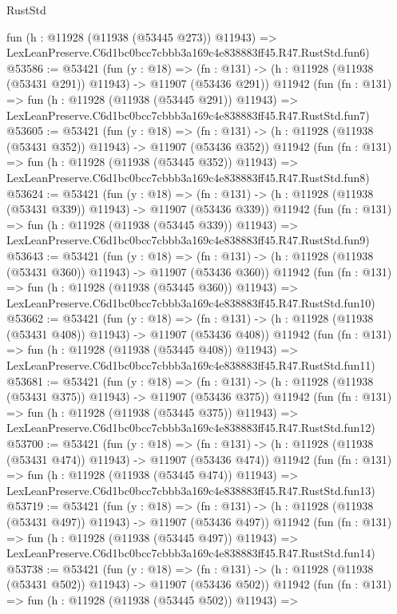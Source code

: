 \begin{lexlean}{RustStd}
\begin{coremodule}
    fun (h : @11928 (@11938 (@53445 @273)) @11943) =>
    LexLeanPreserve.C6d1bc0bcc7cbbb3a169c4e838883ff45.R47.RustStd.fun6)
@53586 := @53421
    (fun (y : @18) =>
    (fn : @131) -> (h : @11928 (@11938 (@53431 @291)) @11943) -> @11907 (@53436 @291))
    @11942
    (fun (fn : @131) =>
    fun (h : @11928 (@11938 (@53445 @291)) @11943) =>
    LexLeanPreserve.C6d1bc0bcc7cbbb3a169c4e838883ff45.R47.RustStd.fun7)
@53605 := @53421
    (fun (y : @18) =>
    (fn : @131) -> (h : @11928 (@11938 (@53431 @352)) @11943) -> @11907 (@53436 @352))
    @11942
    (fun (fn : @131) =>
    fun (h : @11928 (@11938 (@53445 @352)) @11943) =>
    LexLeanPreserve.C6d1bc0bcc7cbbb3a169c4e838883ff45.R47.RustStd.fun8)
@53624 := @53421
    (fun (y : @18) =>
    (fn : @131) -> (h : @11928 (@11938 (@53431 @339)) @11943) -> @11907 (@53436 @339))
    @11942
    (fun (fn : @131) =>
    fun (h : @11928 (@11938 (@53445 @339)) @11943) =>
    LexLeanPreserve.C6d1bc0bcc7cbbb3a169c4e838883ff45.R47.RustStd.fun9)
@53643 := @53421
    (fun (y : @18) =>
    (fn : @131) -> (h : @11928 (@11938 (@53431 @360)) @11943) -> @11907 (@53436 @360))
    @11942
    (fun (fn : @131) =>
    fun (h : @11928 (@11938 (@53445 @360)) @11943) =>
    LexLeanPreserve.C6d1bc0bcc7cbbb3a169c4e838883ff45.R47.RustStd.fun10)
@53662 := @53421
    (fun (y : @18) =>
    (fn : @131) -> (h : @11928 (@11938 (@53431 @408)) @11943) -> @11907 (@53436 @408))
    @11942
    (fun (fn : @131) =>
    fun (h : @11928 (@11938 (@53445 @408)) @11943) =>
    LexLeanPreserve.C6d1bc0bcc7cbbb3a169c4e838883ff45.R47.RustStd.fun11)
@53681 := @53421
    (fun (y : @18) =>
    (fn : @131) -> (h : @11928 (@11938 (@53431 @375)) @11943) -> @11907 (@53436 @375))
    @11942
    (fun (fn : @131) =>
    fun (h : @11928 (@11938 (@53445 @375)) @11943) =>
    LexLeanPreserve.C6d1bc0bcc7cbbb3a169c4e838883ff45.R47.RustStd.fun12)
@53700 := @53421
    (fun (y : @18) =>
    (fn : @131) -> (h : @11928 (@11938 (@53431 @474)) @11943) -> @11907 (@53436 @474))
    @11942
    (fun (fn : @131) =>
    fun (h : @11928 (@11938 (@53445 @474)) @11943) =>
    LexLeanPreserve.C6d1bc0bcc7cbbb3a169c4e838883ff45.R47.RustStd.fun13)
@53719 := @53421
    (fun (y : @18) =>
    (fn : @131) -> (h : @11928 (@11938 (@53431 @497)) @11943) -> @11907 (@53436 @497))
    @11942
    (fun (fn : @131) =>
    fun (h : @11928 (@11938 (@53445 @497)) @11943) =>
    LexLeanPreserve.C6d1bc0bcc7cbbb3a169c4e838883ff45.R47.RustStd.fun14)
@53738 := @53421
    (fun (y : @18) =>
    (fn : @131) -> (h : @11928 (@11938 (@53431 @502)) @11943) -> @11907 (@53436 @502))
    @11942
    (fun (fn : @131) =>
    fun (h : @11928 (@11938 (@53445 @502)) @11943) =>

\end{coremodule}
\end{lexlean}
